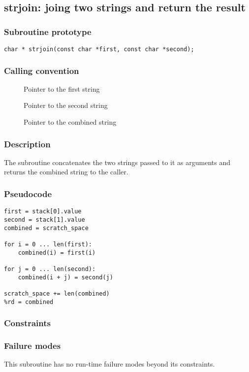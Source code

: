 \clearpage
{}
{}
\label{subr:strjoin}
\subsection*{strjoin: joing two strings and return the result}

\subsubsection*{Subroutine prototype}

\begin{verbatim}
char * strjoin(const char *first, const char *second);
\end{verbatim}

\subsubsection*{Calling convention}

\begin{description}
\item[] Pointer to the first string
\item[] Pointer to the second string
\item[] Pointer to the combined string
\end{description}

\subsubsection*{Description}

The  subroutine concatenates the two strings
passed to it as arguments and returns the combined string to the
caller.

\subsubsection*{Pseudocode}

\begin{verbatim}
first = stack[0].value
second = stack[1].value
combined = scratch_space

for i = 0 ... len(first):
    combined(i) = first(i)

for j = 0 ... len(second):
    combined(i + j) = second(j)

scratch_space += len(combined)
%rd = combined
\end{verbatim}

\subsubsection*{Constraints}

\subsubsection*{Failure modes}

This subroutine has no run-time failure modes beyond its constraints.
